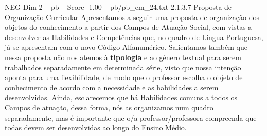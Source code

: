 \begin{textsample}{NEG Dim 2 – pb – Score -1.00 – pb/pb\_em\_24.txt}  \label{ex:f2_neg_012}
2.1.3.7 Proposta de Organização Curricular Apresentamos a seguir uma proposta de organização dos objetos do conhecimento a partir dos Campos de Atuação Social, com vistas a desenvolver as Habilidades e Competências que, no quadro de Língua Portuguesa, já se apresentam com o novo Código Alfanumérico.
Salientamos também que nessa proposta não nos atemos à \textbf{tipologia} e ao gênero textual para serem trabalhados separadamente em determinada série, visto que nossa intenção aponta para uma flexibilidade, de modo que o professor escolha o objeto de conhecimento de acordo com a necessidade e as habilidades a serem desenvolvidas.
Ainda, esclarecemos que há Habilidades comuns a todos os Campos de atuação, dessa forma, nós as organizamos num quadro separadamente, mas é importante que o/a professor/professora compreenda que todas devem ser desenvolvidas ao longo do Ensino Médio.

\end{textsample}
